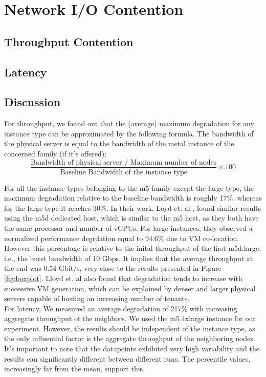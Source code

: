 \chapter{Network I/O Contention}\label{chapter:network}

\section{Throughput Contention}



\section{Latency}



\newpage
\section{Discussion}
For throughput, we found out that the (average) maximum degradation for any instance type 
can be approximated by the following formula. The bandwidth of the physical server is equal
to the bandwidth of the metal instance of the concerned family (if it's offered):
\[
\frac{\text{Bandwidth of physical server / Maximum number of nodes}}
     {\text{Baseline Bandwidth of the instance type}} \times 100
\]

\noindent
For all the instance types belonging to the m5 family except the large type, the maximum degradation 
relative to the baseline bandwidth is roughly 17\%, whereas for the large type it reaches 30\%. In 
their work, Loyd et. al \cite{characterizing_public}, found similar results using the m5d dedicated host,
which is similar to the m5 host, as they both have the same processor and number of vCPUs.  
For large instances, they observed a normalized performance degrdation equal to 94.6\% due to VM 
co-location. However this percentage is relative to the inital throughput of the first m5d.large, 
i.e., the burst bandwidth of 10 Gbps. It implies that the  average throughput at the end was 0.54 Gbit/s, 
very close to the results presented in Figure \ref{fig:boxplot}. Lloyd et. al also found
that degradation tends to increase with successive  VM generation, which can be explained by 
denser and larger physical servers capable of hosting an increasing number of tenants. \\ 
For latency, We measured an average degradation of 217\% with increasing aggregate throughput of the 
neighbors. We used the m5.4xlarge instance for our experiment. However, the results 
should be independent of the instance type, as the only influential factor is the aggregate 
throughput of the neighboring nodes. It's important to note that the datapoints exhibited 
very high variability and the results can significantly different between different runs. 
The percentile values, increasingly far from the mean, support this. 

